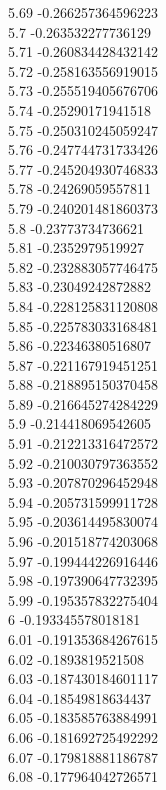 {5.69	-0.266257364596223\\
5.7	-0.263532277736129\\
5.71	-0.260834428432142\\
5.72	-0.258163556919015\\
5.73	-0.255519405676706\\
5.74	-0.25290171941518\\
5.75	-0.250310245059247\\
5.76	-0.247744731733426\\
5.77	-0.245204930746833\\
5.78	-0.24269059557811\\
5.79	-0.240201481860373\\
5.8	-0.23773734736621\\
5.81	-0.2352979519927\\
5.82	-0.232883057746475\\
5.83	-0.23049242872882\\
5.84	-0.228125831120808\\
5.85	-0.225783033168481\\
5.86	-0.22346380516807\\
5.87	-0.221167919451251\\
5.88	-0.218895150370458\\
5.89	-0.216645274284229\\
5.9	-0.214418069542605\\
5.91	-0.212213316472572\\
5.92	-0.210030797363552\\
5.93	-0.207870296452948\\
5.94	-0.205731599911728\\
5.95	-0.203614495830074\\
5.96	-0.201518774203068\\
5.97	-0.199444226916446\\
5.98	-0.197390647732395\\
5.99	-0.195357832275404\\
6	-0.193345578018181\\
6.01	-0.191353684267615\\
6.02	-0.1893819521508\\
6.03	-0.187430184601117\\
6.04	-0.18549818634437\\
6.05	-0.183585763884991\\
6.06	-0.181692725492292\\
6.07	-0.179818881186787\\
6.08	-0.177964042726571\\
}
